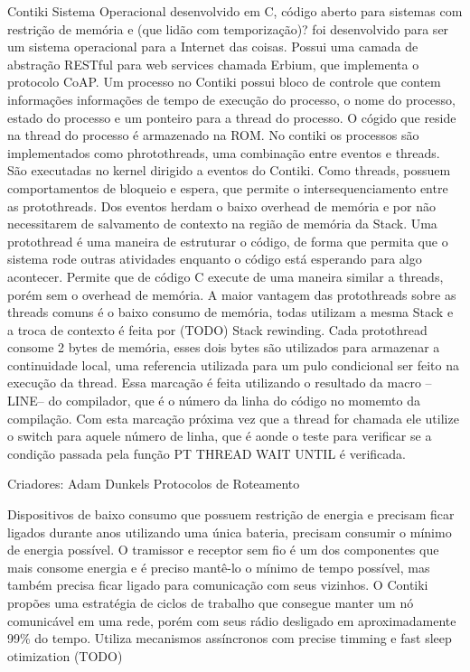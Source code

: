Contiki Sistema Operacional desenvolvido em C, c\'odigo aberto para sistemas com restrição de mem\'oria e (que lidão com temporização)? foi desenvolvido para ser um sistema operacional para a Internet das coisas. Possui uma camada de abstração RESTful para web services chamada Erbium, que implementa o protocolo CoAP.
Um processo no Contiki possui bloco de controle que contem informaç\~oes informaç\~oes de tempo de execução do processo, o nome do processo, estado do processo e um ponteiro para a thread do processo. O c\'ogido que reside na thread do processo \'e armazenado na ROM.
No contiki os processos são implementados como phrotothreads, uma combinação entre eventos e threads. São executadas no kernel dirigido a eventos do Contiki. Como threads, possuem comportamentos de bloqueio e espera, que permite o intersequenciamento entre as protothreads. Dos eventos herdam o baixo overhead de mem\'oria e por não necessitarem de salvamento de contexto na região de mem\'oria da Stack.
Uma protothread \'e uma maneira de estruturar o c\'odigo, de forma que permita que o sistema rode outras atividades enquanto o c\'odigo est\'a esperando para algo acontecer. Permite que de c\'odigo C execute de uma maneira similar a threads, por\'em sem o overhead de mem\'oria.
A maior vantagem das protothreads sobre as threads comuns \'e o baixo consumo de mem\'oria, todas utilizam a mesma Stack e a troca de contexto \'e feita por (TODO) Stack rewinding. Cada protothread consome 2 bytes de mem\'oria, esses dois bytes são utilizados para armazenar a continuidade local, uma referencia utilizada para um pulo condicional ser feito na execução da thread. Essa marcação \'e feita utilizando o resultado da macro --LINE-- do compilador, que \'e o número da linha do c\'odigo no momemto da compilação. Com esta marcação pr\'oxima vez que a thread for chamada ele utilize o switch para aquele número de linha, que \'e aonde o teste para verificar se a condição passada pela função PT THREAD WAIT UNTIL \'e verificada.

Criadores: Adam Dunkels
Protocolos de Roteamento

Dispositivos de baixo consumo que possuem restrição de energia e precisam ficar ligados durante anos utilizando uma única bateria, precisam consumir o m\'inimo de energia poss\'ivel. O tramissor e receptor sem fio \'e um dos componentes que mais consome energia e \'e preciso mantê-lo o m\'inimo de tempo poss\'ivel, mas tamb\'em precisa ficar ligado para comunicação com seus vizinhos. O Contiki prop\~oes uma estrat\'egia de ciclos de trabalho que consegue manter um n\'o comunic\'avel em uma rede, por\'em com seus r\'adio desligado em aproximadamente 99\% do tempo. Utiliza mecanismos ass\'incronos com precise timming e fast sleep otimization (TODO)

